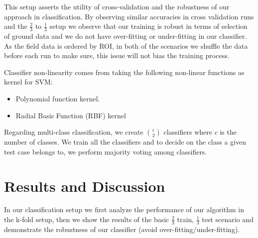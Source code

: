 \documentclass[remotesensing,article,accept,moreauthors,pdftex,12pt,a4paper]{mdpi}
\begin{document}
This setup asserts the utility of cross-validation and the robustness of our approach in classification. By observing similar accuracies in cross validation runs and the $\frac{2}{3}$ to $\frac{1}{3}$ setup we observe that our training is robust in terms of selection of ground data and we do not have  over-fitting or under-fitting in our classifier. As the field data is ordered by ROI, in both of the scenarios we shuffle the data before each run to make sure, this issue will not bias the training process.

Classifier non-linearity comes from taking the following non-linear functions as kernel for SVM: 

\begin{itemize}
\item Polynomial function kernel.
\item Radial Basis Function (RBF) kernel
\end{itemize}

Regarding multi-class classification, we create $\binom{c}{2}$ classifiers where $c$ is the number of classes. We train all the classifiers and to decide on the class a given test case belongs to, we perform majority voting among classifiers. 








\section{Results and Discussion}

In our classification setup we first analyze the performance of our algorithm in the k-fold setup, then we show the results of the basic $\frac{2}{3}$ train, $\frac{1}{3}$ test scenario and demonstrate the robustness of our classifier (avoid over-fitting/under-fitting).
\end{document}
